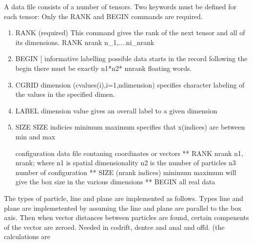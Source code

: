 A data file consists of a number of tensors.
Two keywords must be defined for each tensor:
Only the RANK and BEGIN commands are required.
\begin{enumerate}
\item RANK (required)
This command gives the rank of the next tensor
and all of its dimensions.
\bv
 RANK nrank n_1,....ni_nrank
\ev
\item
\bv
 BEGIN [ informative labelling possible
\ev
   data starts in the record following the begin
   there must be exactly n1*n2*   nnrank floating words.
 
\item
 CGRID dimension (cvalues(i),i=1,ndimension)
     specifies character labeling of the values in the specified dimen.
\item
 LABEL dimension value
     gives an overall label to a given dimension
\item SIZE
 SIZE indicies minimum maximum
     specifies that x(indices) are between min and max
 
   configuration  data file contaning coordinates or vectors
       ** RANK nrank n1,    nrank; where n1 is spatial dimensionality                                         n2 is the number of particles
                                         n3 number of configuration
       ** SIZE (nrank indices) minimum maximum
             will give the box size in the various dimensions
       **  BEGIN
             all real data

\end{enumerate}
The types of particle, line and plane are implemented as follows.
Types line and plane are implemetented by assuming the line and
plane are parallel to the box axis. Then when vector distances between
particles are found, certain compenents of the vector are zeroed.
Needed in codrift, dsntce and anal and offd. (the calculations are

